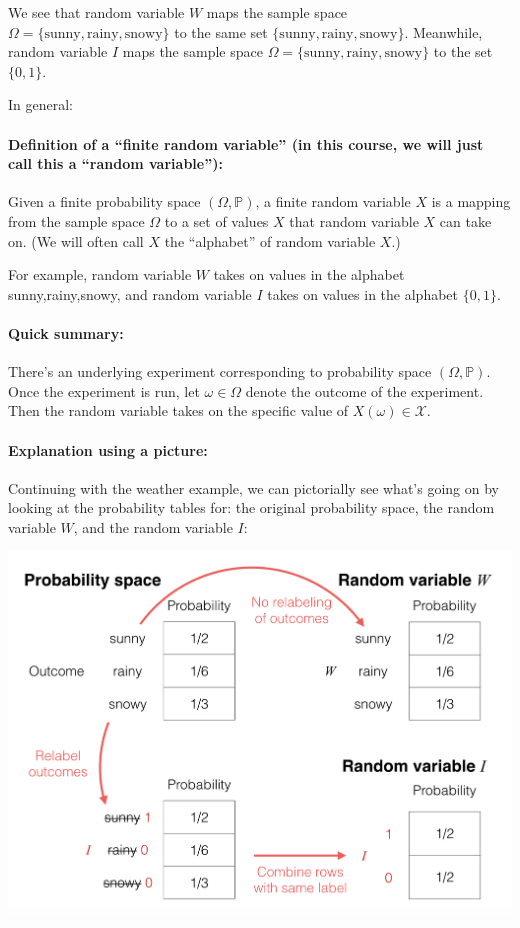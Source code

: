 \documentclass[6008notes.tex]{subfiles}
\begin{document}
We see that random variable $W$ maps the sample space $\Omega =\{ \text {sunny},\text {rainy},\text {snowy}\}$ to the same set $\{ \text {sunny},\text {rainy},\text {snowy}\}$. Meanwhile, random variable $I$ maps the sample space $\Omega =\{ \text {sunny},\text {rainy},\text {snowy}\}$ to the set $\{ 0,1\}$.

In general:

\paragraph{Definition of a ``finite random variable'' (in this course, we will just call this a ``random variable''):} Given a finite probability space $(\Omega , \mathbb {P})$, a finite random variable $X$ is a mapping from the sample space $\Omega$ to a set of values $X$ that random variable $X$ can take on. (We will often call $X$ the ``alphabet'' of random variable $X$.)

For example, random variable $W$ takes on values in the alphabet {sunny,rainy,snowy}, and random variable $I$ takes on values in the alphabet $\{ 0,1\}$.

\paragraph{Quick summary:} There's an underlying experiment corresponding to probability space $(\Omega , \mathbb {P})$. Once the experiment is run, let $\omega \in \Omega$ denote the outcome of the experiment. Then the random variable takes on the specific value of $X(\omega )\in \mathcal{X}$.

\paragraph{Explanation using a picture:} Continuing with the weather example, we can pictorially see what's going on by looking at the probability tables for: the original probability space, the random variable $W$, and the random variable $I$:

{\centering\includegraphics[scale=0.4]{images_sec-random-variables-main}}
\end{document}
